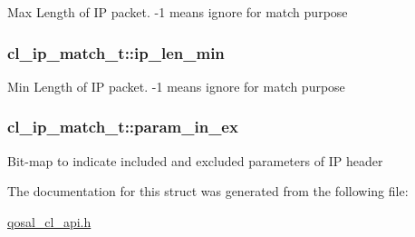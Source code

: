 Max Length of I\-P packet. -\/1 means ignore for match purpose \hypertarget{structcl__ip__match__t_ac792bdfd358aa3ecab74480f1450c1de}{
\subsubsection[{ip\-\_\-len\-\_\-min}]{ cl\-\_\-ip\-\_\-match\-\_\-t\-::ip\-\_\-len\-\_\-min}}\label{structcl__ip__match__t_ac792bdfd358aa3ecab74480f1450c1de}
Min Length of I\-P packet. -\/1 means ignore for match purpose \hypertarget{structcl__ip__match__t_a1d1364036356ddfe8731f777c02f186d}{
\subsubsection[{param\-\_\-in\-\_\-ex}]{ cl\-\_\-ip\-\_\-match\-\_\-t\-::param\-\_\-in\-\_\-ex}}\label{structcl__ip__match__t_a1d1364036356ddfe8731f777c02f186d}
Bit-\/map to indicate included and excluded parameters of I\-P header 

The documentation for this struct was generated from the following file\-:\begin{DoxyCompactItemize}
\item 
\hyperlink{qosal__cl__api_8h}{qosal\-\_\-cl\-\_\-api.\-h}\end{DoxyCompactItemize}
